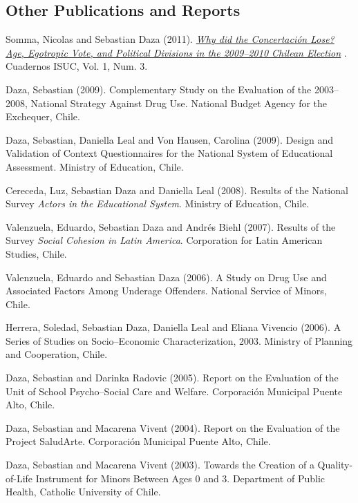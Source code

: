 \documentclass[10pt,letterpaper]{article}
\renewenvironment{itemize}{
  \begin{list}{}{
    \setlength{\leftmargin}{1.5em}
    \setlength{\itemsep}{0.25em}
    \setlength{\parskip}{0pt}
    \setlength{\parsep}{0.25em}
  }
}{
  \end{list}
}
\begin{document}
\subsection*{Other Publications and Reports}

\begin{itemize}

\item Somma, Nicolas and Sebastian Daza (2011).
  \textit{
  \href{https://sdaza.com/assets/pdf/articulo-nicolas-somma.pdf}
  {Why did the Concertación Lose? Age, Egotropic Vote, and Political Divisions in the 2009--2010 Chilean Election}
  }.
  Cuadernos ISUC, Vol. 1, Num. 3.

\item Daza, Sebastian (2009). Complementary Study on the Evaluation of the 2003--2008, National Strategy Against Drug Use. National Budget Agency for the Exchequer, Chile.

\item Daza, Sebastian, Daniella Leal and Von Hausen, Carolina (2009). Design and Validation of Context Questionnaires for the National System of Educational Assessment. Ministry of Education, Chile.

\item Cereceda, Luz, Sebastian Daza and Daniella Leal (2008). Results of the National Survey \textit{Actors in the Educational System}. Ministry of Education, Chile.

\item Valenzuela, Eduardo, Sebastian Daza and Andrés Biehl (2007). Results of the Survey \textit{Social Cohesion in Latin America}. Corporation for Latin American Studies, Chile.

\item Valenzuela, Eduardo and Sebastian Daza (2006). A Study on Drug Use and Associated Factors Among Underage Offenders. National Service of Minors, Chile.

\item Herrera, Soledad, Sebastian Daza, Daniella Leal and Eliana Vivencio (2006). A Series of Studies on Socio--Economic Characterization, 2003. Ministry of Planning and Cooperation, Chile.

\item Daza, Sebastian and Darinka Radovic (2005). Report on the Evaluation of the Unit of School Psycho--Social Care and Welfare. Corporación Municipal Puente Alto, Chile.

\item Daza, Sebastian and  Macarena Vivent (2004). Report on the Evaluation of the Project SaludArte. Corporación Municipal Puente Alto, Chile.

\item Daza, Sebastian and Macarena Vivent (2003). Towards the Creation of a Quality-of-Life Instrument for Minors Between Ages 0 and 3. Department of Public Health, Catholic University of Chile.


\end{itemize}
\end{document}
